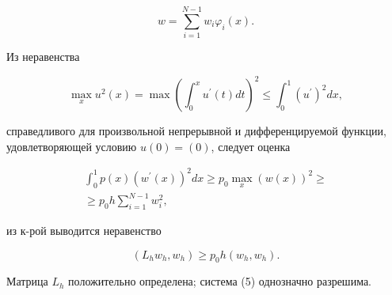 \documentclass[10pt]{article}
\begin{document}
\[

w=\sum_{i=1}^{N-1} w_{i} \varphi_{i}(x) .

\]



Из неравенства



\[

\max _{x} u^{2}(x)=\max \left(\int_{0}^{x} u^{\prime}(t) d t\right)^{2} \leqslant \int_{0}^{1}\left(u^{\prime}\right)^{2} d x,

\]



справедливого для произвольной непрерывной и дифференцируемой функции, удовлетворяющей условию $u(0)=(0)$, следует оценка



\[

\begin{gathered}

\int_{0}^{1} p(x)\left(w^{\prime}(x)\right)^{2} d x \geqslant p_{0} \max _{x}(w(x))^{2} \geqslant \\

\geqslant p_{0} h \sum_{i=1}^{N-1} w_{i}^{2},

\end{gathered}

\]



из к-рой выводится неравенство



\[

\left(L_{h} w_{h}, w_{h}\right) \geqslant p_{0} h\left(w_{h}, w_{h}\right) .

\]



Матрица $L_{h}$ положительно определена; система (5) однозначно разрешима.
\end{document}
